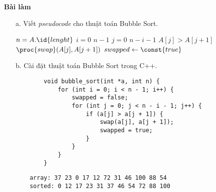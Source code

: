 \documentclass[12pt,a4paper]{article}
\begin{document}
\begin{center}
    \textbf{Bài làm}
\end{center}

\begin{enumerate}
    \item[a.] Viết \textit{pseudocode} cho thuật toán Bubble Sort.
    \begin{codebox}
            \li $n = A.\id{lenght}$
            \li \For $i = 0$ \To $n - 1$
                \Do
                    \li \For $j = 0$ \To $n - i - 1$
                        \Do
                            \li \If $A[j] > A[j + 1]$
                            \Then
                                \li $\proc{swap}(A[j], A[j + 1])$
                                \li $swapped \gets \const{true}$
                            \End
                        \End
                \End
    \end{codebox}

    \item[b.] Cài đặt thuật toán Bubble Sort trong C++.
    \begin{verbatim}
        void bubble_sort(int *a, int n) {
            for (int i = 0; i < n - 1; i++) {
                swapped = false;
                for (int j = 0; j < n - i - 1; j++) {
                    if (a[j] > a[j + 1]) {
                        swap(a[j], a[j + 1]);
                        swapped = true;
                    }
                }
            }
        }
    \end{verbatim}

    \begin{verbatim}
    array: 37 23 0 17 12 72 31 46 100 88 54
    sorted: 0 12 17 23 31 37 46 54 72 88 100
    \end{verbatim}


\end{enumerate}
\end{document}
